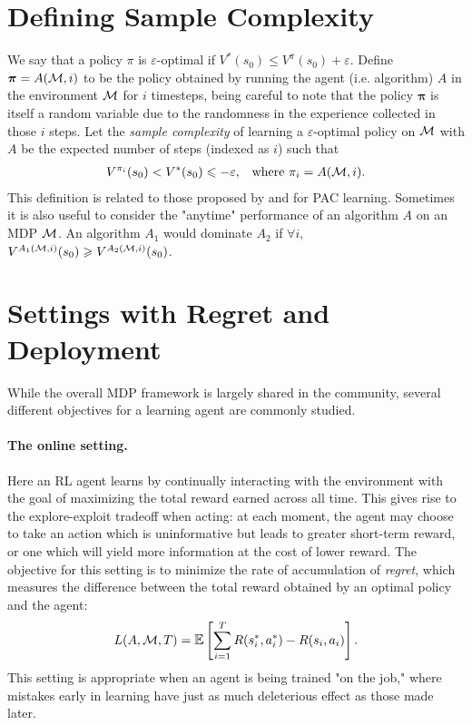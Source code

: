 

\section{Defining Sample Complexity}

We say that a policy $\pi$ is $\varepsilon$-optimal if $V^*(s_0) \le V^\pi(s_0) + \varepsilon$.
Define $\bm{\pi} = A(\mathcal{M}, i)$ to be the policy obtained by running the agent (i.e. algorithm) $A$ in the environment $\mathcal{M}$ for $i$ timesteps, being careful to note that the policy $\bm{\pi}$ is itself a random variable due to the randomness in the experience collected in those $i$ steps.
Let the \emph{sample complexity} of learning a $\varepsilon$-optimal policy on $\mathcal{M}$ with $A$ be the expected number of steps (indexed as $i$) such that
\begin{align}
    V^{\pi_i}(s_0) < V^*(s_0) \leqslant - \varepsilon, && \text{where } \pi_i = A(\mathcal{M}, i).
\end{align}
This definition is related to those proposed by \citet{Fiechter1994EfficientRL} and \citet{strehl2008analysis} for PAC learning.
Sometimes it is also useful to consider the "anytime" performance of an algorithm $A$ on an MDP $\mathcal{M}$.
An algorithm $A_1$ would dominate $A_2$ if $\forall i$, $V^{A_1(\mathcal{M}, i)}(s_0) \geqslant V^{A_2(\mathcal{M}, i)}(s_0)$.



\section{Settings with Regret and Deployment} \label{sec:regret-deployment}

While the overall MDP framework is largely shared in the community, several different objectives for a learning agent are commonly studied.

\paragraph{The online setting.}
Here an RL agent learns by continually interacting with the environment with the goal of maximizing the total reward earned across all time.
This gives rise to the explore-exploit tradeoff when acting: at each moment, the agent may choose to take an action which is uninformative but leads to greater short-term reward, or one which will yield more information at the cost of lower reward.
The objective for this setting is to minimize the rate of accumulation of \emph{regret}, which measures the difference between the total reward obtained by an optimal policy and the agent:
\begin{align}
    L(A, \mdp, T) = \E \left[ \sum_{i=1}^T R(s^*_i, a^*_i) - R(s_i, a_i) \right].
\end{align}
This setting is appropriate when an agent is being trained "on the job," where mistakes early in learning have just as much deleterious effect as those made later.


